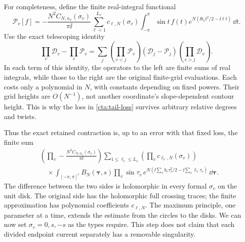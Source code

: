 For completeness, define the finite real-integral functional
\[
 \mathcal P_v[f]=-\frac{N^2C_{N,n_v}(\sigma_v)}{\pi\ii}
   \sum_{\ell=1}^{L_v}c_{\ell,N}(\sigma_v)
   \int_{-\pi}^{\pi}\sin t\,f(t)
            e^{N(\ii b_vt^2/2-\ii\ell t)}\,\dd t .
\]
Use the exact telescoping identity
\begin{equation}\label{cta:telescoping}
 \prod_v\mathcal D_v-\prod_v\mathcal P_v
 =\sum_j\left(\prod_{v<j}\mathcal P_v\right)
        (\mathcal D_j-\mathcal P_j)
        \left(\prod_{v>j}\mathcal D_v\right).
\end{equation}
In each term of this identity, the operators to the left are finite
sums of real integrals, while those to the right are the original
finite-grid evaluations. Each costs only a polynomial
in \(N\), with constants depending on fixed powers.
Their grid heights are \(O(N^{-1})\), not another
coordinate's slope-dependent contour height. This is why
the loss in \eqref{cta:tail-loss} survives arbitrary relative
degrees and twists.

Thus the exact retained contraction is, up to an error with
that fixed loss, the finite sum
\begin{equation}\label{cta:finite-charges}
 \begin{split}
 &
 \left(\prod_v-\frac{N^2C_{N,n_v}(\sigma_v)}{\pi\ii}\right)
 \sum_{1\le\ell_v\le L_v}\!
     \left(\prod_vc_{\ell_v,N}(\sigma_v)\right)\\
 &\quad\times
     \int_{[-\pi,\pi]^r}B_N(\boldsymbol\tau,s)
          \prod_v\sin\tau_v\,
          e^{N(\ii\sum_v b_v\tau_v^2/2-\ii\sum_v\ell_v\tau_v)}
                     \,\dd\boldsymbol\tau .
 \end{split}
\end{equation}
The difference between the two sides is holomorphic in every formal
\(\sigma_v\) on the unit disk. The original side has the
holomorphic full crossing traces; the finite approximation
has polynomial coefficients \(c_{\ell,N}\).
The maximum principle, one parameter at a time, extends the
estimate from the circles to the disks. We can now set
\(\sigma_v=0,s,-s\) as the types require. This step
does not claim that each divided endpoint current separately
has a removable singularity.

